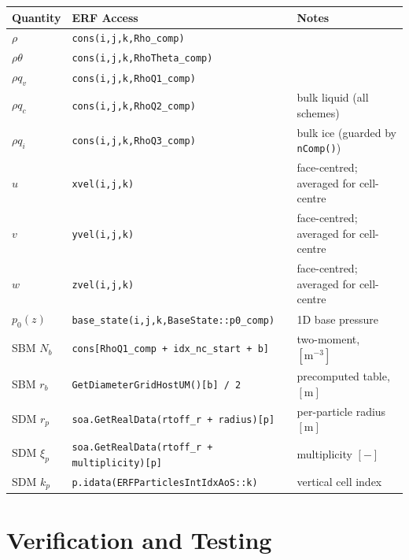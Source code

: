 \documentclass[11pt,letterpaper]{article}
\begin{document}
\begin{center}
\begin{tabular}{lll}
\toprule
Quantity & ERF Access & Notes \\
\midrule
$\rho$ & \texttt{cons(i,j,k,Rho\_comp)} & \\
$\rho\theta$ & \texttt{cons(i,j,k,RhoTheta\_comp)} & \\
$\rho q_v$ & \texttt{cons(i,j,k,RhoQ1\_comp)} & \\
$\rho q_c$ & \texttt{cons(i,j,k,RhoQ2\_comp)} & bulk liquid (all schemes) \\
$\rho q_i$ & \texttt{cons(i,j,k,RhoQ3\_comp)} & bulk ice (guarded by \texttt{nComp()}) \\
$u$ & \texttt{xvel(i,j,k)} & face-centred; averaged for cell-centre \\
$v$ & \texttt{yvel(i,j,k)} & face-centred; averaged for cell-centre \\
$w$ & \texttt{zvel(i,j,k)} & face-centred; averaged for cell-centre \\
$p_0(z)$ & \texttt{base\_state(i,j,k,BaseState::p0\_comp)} & 1D base pressure \\
SBM $N_b$ & \texttt{cons[RhoQ1\_comp + idx\_nc\_start + b]} & two-moment, $[\mathrm{m}^{-3}]$ \\
SBM $r_b$ & \texttt{GetDiameterGridHostUM()[b] / 2} & precomputed table, $[\mathrm{m}]$ \\
SDM $r_p$ & \texttt{soa.GetRealData(rtoff\_r + radius)[p]} & per-particle radius $[\mathrm{m}]$ \\
SDM $\xi_p$ & \texttt{soa.GetRealData(rtoff\_r + multiplicity)[p]} & multiplicity $[-]$ \\
SDM $k_p$ & \texttt{p.idata(ERFParticlesIntIdxAoS::k)} & vertical cell index \\
\bottomrule
\end{tabular}
\end{center}

\section{Verification and Testing}
\end{document}
